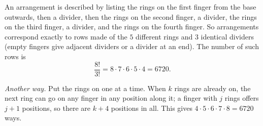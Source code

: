 An arrangement is described by listing the rings on the first finger from the base outwards, then a divider, then the rings on the second finger, a divider, the rings on the third finger, a divider, and the rings on the fourth finger. So arrangements correspond exactly to rows made of the $5$ different rings and $3$ identical dividers (empty fingers give adjacent dividers or a divider at an end). The number of such rows is
\[\dfrac{8!}{3!}=8\cdot7\cdot6\cdot5\cdot4=\boxed{6720}.\]

\emph{Another way.} Put the rings on one at a time. When $k$ rings are already on, the next ring can go on any finger in any position along it; a finger with $j$ rings offers $j+1$ positions, so there are $k+4$ positions in all. This gives $4\cdot5\cdot6\cdot7\cdot8=6720$ ways.
